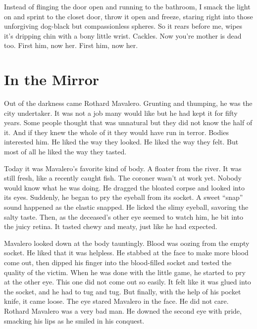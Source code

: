 Instead of flinging the door open and running to the bathroom, I
smack the light on and sprint to the closet door, throw it open and
freeze, staring right into those unforgiving dog-black but
compassionless spheres. So it rears before me, wipes it's
dripping chin with a bony little wrist. Cackles. Now you're
mother is dead too. First him, now her. First him, now her. 

 



\chapter{In the Mirror}


Out of the darkness came Rothard Mavalero. Grunting and thumping,
he was the city undertaker. It was not a job many would like but he
had kept it for fifty years. Some people thought that was unnatural
but they did not know the half of it. And if they knew the whole of
it they would have run in terror. Bodies interested him. He liked
the way they looked. He liked the way they felt. But most of all he
liked the way they tasted.



Today it was Mavalero's favorite kind of body. A floater from the
river. It was still fresh, like a recently caught fish. The coroner
wasn't at work yet. Nobody would know what he was doing. He dragged
the bloated corpse and looked into its eyes. Suddenly, he began to
pry the eyeball from its socket. A sweet ``snap'' sound happened as
the elastic snapped. He licked the slimy eyeball, savoring the
salty taste. Then, as the deceased's other eye seemed to watch him,
he bit into the juicy retina. It tasted chewy and meaty, just like
he had expected.



Mavalero looked down at the body tauntingly. Blood was oozing from
the empty socket. He liked that it was helpless. He stabbed at the
face to make more blood come out, then dipped his finger into the
blood-filled socket and tested the quality of the victim. When he
was done with the little game, he started to pry at the other eye.
This one did not come out so easily. It felt like it was glued into
the socket, and he had to tug and tug. But finally, with the help
of his pocket knife, it came loose. The eye stared Mavalero in the
face. He did not care. Rothard Mavalero was a very bad man. He
downed the second eye with pride, smacking his lips as he smiled in
his conquest.



